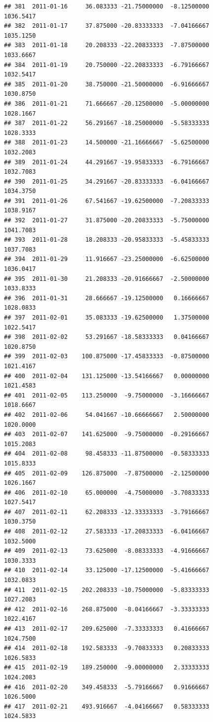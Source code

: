 \documentclass[
]{article}
\begin{document}
\begin{verbatim}
## 381  2011-01-16     36.083333 -21.75000000  -8.12500000    1036.5417
## 382  2011-01-17     37.875000 -20.83333333  -7.04166667    1035.1250
## 383  2011-01-18     20.208333 -22.20833333  -7.87500000    1033.6667
## 384  2011-01-19     20.750000 -22.20833333  -6.79166667    1032.5417
## 385  2011-01-20     38.750000 -21.50000000  -6.91666667    1030.8750
## 386  2011-01-21     71.666667 -20.12500000  -5.00000000    1028.1667
## 387  2011-01-22     56.291667 -18.25000000  -5.58333333    1028.3333
## 388  2011-01-23     14.500000 -21.16666667  -5.62500000    1032.2083
## 389  2011-01-24     44.291667 -19.95833333  -6.79166667    1032.7083
## 390  2011-01-25     34.291667 -20.83333333  -6.04166667    1034.3750
## 391  2011-01-26     67.541667 -19.62500000  -7.20833333    1038.9167
## 392  2011-01-27     31.875000 -20.20833333  -5.75000000    1041.7083
## 393  2011-01-28     18.208333 -20.95833333  -5.45833333    1037.7083
## 394  2011-01-29     11.916667 -23.25000000  -6.62500000    1036.0417
## 395  2011-01-30     21.208333 -20.91666667  -2.50000000    1033.8333
## 396  2011-01-31     28.666667 -19.12500000   0.16666667    1028.0833
## 397  2011-02-01     35.083333 -19.62500000   1.37500000    1022.5417
## 398  2011-02-02     53.291667 -18.58333333   0.04166667    1020.8750
## 399  2011-02-03    100.875000 -17.45833333  -0.87500000    1021.4167
## 400  2011-02-04    131.125000 -13.54166667   0.00000000    1021.4583
## 401  2011-02-05    113.250000  -9.75000000  -3.16666667    1018.6667
## 402  2011-02-06     54.041667 -10.66666667   2.50000000    1020.0000
## 403  2011-02-07    141.625000  -9.75000000  -0.29166667    1015.2083
## 404  2011-02-08     98.458333 -11.87500000  -0.58333333    1015.8333
## 405  2011-02-09    126.875000  -7.87500000  -2.12500000    1026.1667
## 406  2011-02-10     65.000000  -4.75000000  -3.70833333    1027.5417
## 407  2011-02-11     62.208333 -12.33333333  -3.79166667    1030.3750
## 408  2011-02-12     27.583333 -17.20833333  -6.04166667    1032.5000
## 409  2011-02-13     73.625000  -8.08333333  -4.91666667    1030.3333
## 410  2011-02-14     33.125000 -17.12500000  -5.41666667    1032.0833
## 411  2011-02-15    202.208333 -10.75000000  -5.83333333    1027.2083
## 412  2011-02-16    268.875000  -8.04166667  -3.33333333    1022.4167
## 413  2011-02-17    209.625000  -7.33333333   0.41666667    1024.7500
## 414  2011-02-18    192.583333  -9.70833333   0.20833333    1026.5833
## 415  2011-02-19    189.250000  -9.00000000   2.33333333    1024.2083
## 416  2011-02-20    349.458333  -5.79166667   0.91666667    1026.5000
## 417  2011-02-21    493.916667  -4.04166667   0.58333333    1024.5833

\end{verbatim}
\end{document}
